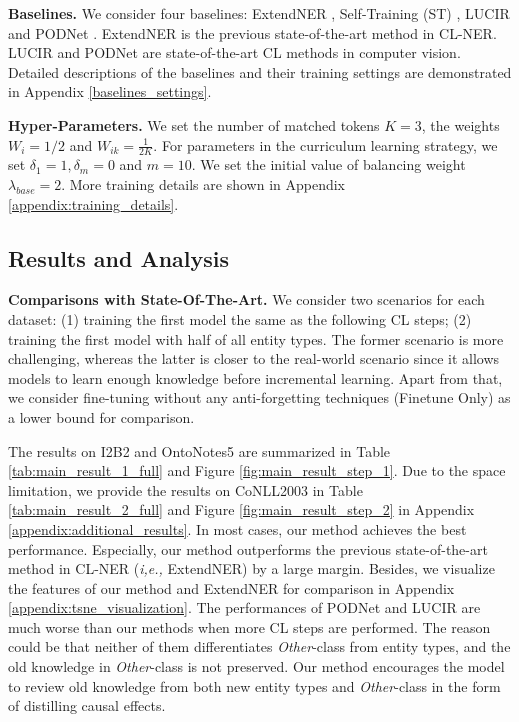 \documentclass[11pt]{article}
\begin{document}
\noindent\textbf{Baselines.}\quad
We consider four baselines: 
ExtendNER \citep{monaikul2021continual}, Self-Training (ST) \citep{rosenberg2005semi,de2019continual}, LUCIR \citep{hou2019learning} and PODNet \citep{douillard2020podnet}.
ExtendNER is the previous state-of-the-art method in CL-NER.
LUCIR and PODNet are state-of-the-art CL methods in computer vision.
Detailed descriptions of the baselines and their training settings are demonstrated in Appendix \ref{baselines_settings}.

\noindent\textbf{Hyper-Parameters.}\quad
We set the number of matched tokens $K=3$, the weights $W_i=1/2$ and $W_{ik}=\frac{1}{2K}$.
For parameters in the curriculum learning strategy, we set $\delta_1=1, \delta_m=0$ and $m=10$.
We set the initial value of balancing weight $\lambda_{base}=2$.
More training details are shown in Appendix \ref{appendix:training_details}.

\subsection{Results and Analysis}
\noindent\textbf{Comparisons with State-Of-The-Art.}\quad
We consider two scenarios for each dataset: (1) training the first model the same as the following CL steps; (2) training the first model with half of all entity types.
The former scenario is more challenging, whereas the latter is closer to the real-world scenario since it allows models to learn enough knowledge before incremental learning.
Apart from that, we consider fine-tuning without any anti-forgetting techniques (Finetune Only) as a lower bound for comparison.

The results on I2B2 and OntoNotes5 are summarized in Table \ref{tab:main_result_1_full} and Figure \ref{fig:main_result_step_1}.
Due to the space limitation, we provide the results on CoNLL2003 in Table \ref{tab:main_result_2_full} and Figure \ref{fig:main_result_step_2} in Appendix \ref{appendix:additional_results}.
In most cases, our method achieves the best performance.
Especially, our method outperforms the previous state-of-the-art method in CL-NER (\textit{i,e.,} ExtendNER) by a large margin.
Besides, we visualize the features of our method and ExtendNER for comparison in Appendix \ref{appendix:tsne_visualization}.
The performances of PODNet and LUCIR are much worse than our methods when more CL steps are performed. 
The reason could be that neither of them differentiates \textit{Other}-class from entity types, and the old knowledge in \textit{Other}-class is not preserved.
Our method encourages the model to review old knowledge from both new entity types and \textit{Other}-class in the form of distilling causal effects.
\end{document}
